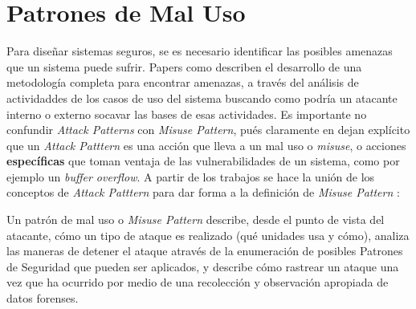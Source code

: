 
\section{Patrones de Mal Uso}
Para diseñar sistemas seguros, se es necesario identificar las posibles amenazas que un sistema puede sufrir. Papers como \cite{fernandez2006defining, fernandez2007attack, braz2008eliciting, fernandez2013security} describen el desarrollo de una metodología completa para encontrar amenazas, a través del análisis de actividaddes de los casos de uso del sistema buscando como podría un atacante interno o externo socavar las bases de esas actividades. Es importante no confundir \textit{Attack Patterns} con \textit{Misuse Pattern}, pués claramente en \cite{ModMisusePatt, fernandez2013security} dejan explícito que un \textit{Attack Patttern} es una acción que lleva a un mal uso o \textit{misuse}, o acciones \textbf{específicas} que toman ventaja de las vulnerabilidades de un sistema, como por ejemplo un \textit{buffer overflow}. A partir de los trabajos \cite{fernandez2007attack, yoshioka2006development, yoshioka2007integration}  se hace la unión de los conceptos de \textit{Attack Patttern} para dar forma a la definición de \textit{Misuse Pattern} \cite{ModMisusePatt, pelaez2009misuse, fernandez2010worm, hashizume2011misuse, munoz2011misuse, fernandez2012misuse, alkazimi2014, encinamisuse}:
\begin{center}
    Un patrón de mal uso o \textit{Misuse Pattern} describe, desde el punto de vista del atacante, cómo un tipo de ataque es realizado (qué unidades usa y cómo), analiza las maneras de detener el ataque através de la enumeración de posibles Patrones de Seguridad que pueden ser aplicados, y describe cómo rastrear un ataque una vez que ha ocurrido por medio de una recolección y observación apropiada de datos forenses.
\end{center}

